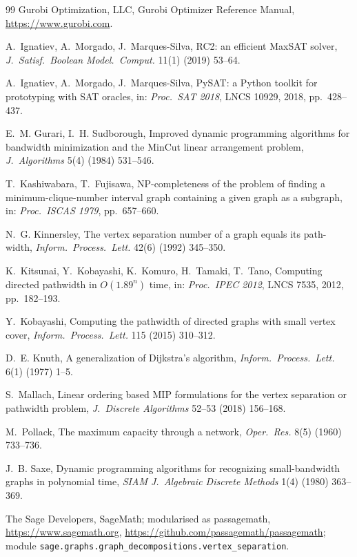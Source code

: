 \documentclass[11pt]{article}
\theoremstyle{definition}
\begin{document}
\begin{thebibliography}{99}
Gurobi Optimization, LLC,
Gurobi Optimizer Reference Manual, \url{https://www.gurobi.com}.

A.~Ignatiev, A.~Morgado, J.~Marques-Silva,
RC2: an efficient MaxSAT solver,
\emph{J.\ Satisf.\ Boolean Model.\ Comput.} 11(1) (2019) 53--64.

A.~Ignatiev, A.~Morgado, J.~Marques-Silva,
PySAT: a Python toolkit for prototyping with SAT oracles,
in: \emph{Proc.\ SAT 2018}, LNCS 10929, 2018, pp.~428--437.

E.~M. Gurari, I.~H. Sudborough,
Improved dynamic programming algorithms for bandwidth minimization and the
MinCut linear arrangement problem,
\emph{J.\ Algorithms} 5(4) (1984) 531--546.

T.~Kashiwabara, T.~Fujisawa,
NP-completeness of the problem of finding a minimum-clique-number interval
graph containing a given graph as a subgraph,
in: \emph{Proc.\ ISCAS 1979}, pp.~657--660.

N.~G. Kinnersley,
The vertex separation number of a graph equals its path-width,
\emph{Inform.\ Process.\ Lett.} 42(6) (1992) 345--350.

K.~Kitsunai, Y.~Kobayashi, K.~Komuro, H.~Tamaki, T.~Tano,
Computing directed pathwidth in $O(1.89^n)$ time,
in: \emph{Proc.\ IPEC 2012}, LNCS 7535, 2012, pp.~182--193.

Y.~Kobayashi,
Computing the pathwidth of directed graphs with small vertex cover,
\emph{Inform.\ Process.\ Lett.} 115 (2015) 310--312.

D.~E. Knuth,
A generalization of Dijkstra's algorithm,
\emph{Inform.\ Process.\ Lett.} 6(1) (1977) 1--5.

S.~Mallach,
Linear ordering based MIP formulations for the vertex separation or
pathwidth problem,
\emph{J.\ Discrete Algorithms} 52--53 (2018) 156--168.

M.~Pollack,
The maximum capacity through a network,
\emph{Oper.\ Res.} 8(5) (1960) 733--736.

J.~B. Saxe,
Dynamic programming algorithms for recognizing small-bandwidth graphs in
polynomial time,
\emph{SIAM J.\ Algebraic Discrete Methods} 1(4) (1980) 363--369.

The Sage Developers, SageMath; modularised as passagemath,
\url{https://www.sagemath.org}, \url{https://github.com/passagemath/passagemath};
module \texttt{sage.graphs.graph\_decompositions.vertex\_separation}.


\end{thebibliography}
\end{document}
